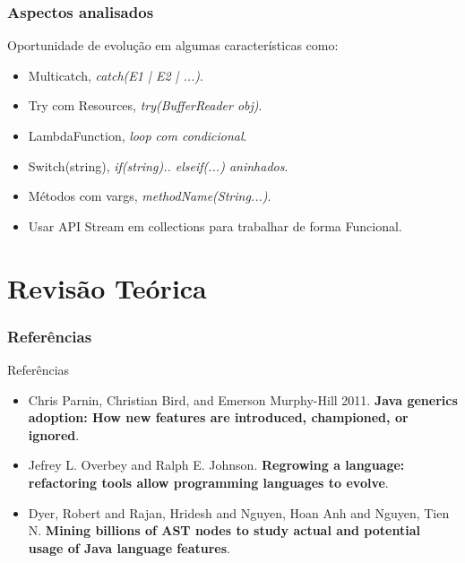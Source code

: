 \documentclass[]{beamer}
\begin{document}
	\begin{frame}[label=ApectosAnalisados]
		\frametitle{Aspectos analisados}
		
			\begin{block}{Oportunidade de evolução em algumas características como:}
				\begin{itemize}
					\item Multicatch, \textit{catch(E1 | E2 | ...)}.
					\item Try com Resources, \textit{try(BufferReader obj)}.
					\item LambdaFunction, \textit{loop com condicional}.
					\item Switch(string), \textit{if(string).. elseif(...) aninhados}.
					\item Métodos com vargs, \textit{methodName(String...)}.
					\item Usar API Stream em collections para trabalhar de forma Funcional.
				\end{itemize}
			\end{block}
	\end{frame}
	

	
%			



	\section{Revisão Teórica}
	\frametitle{Referências}
	\begin{frame}[label=referencias]
		\begin{block}{Referências}
			\begin{itemize}
				\item Chris Parnin, Christian Bird, and Emerson Murphy-Hill 2011. \textbf{Java generics adoption: How new features are introduced, championed, or ignored}.
				
				\item Jefrey L. Overbey and Ralph E. Johnson. \textbf{Regrowing a language: refactoring tools
				allow programming languages to evolve}.
				
				\item Dyer, Robert and Rajan, Hridesh and Nguyen, Hoan Anh and Nguyen, Tien N. \textbf{Mining billions of AST nodes to study actual and potential usage of Java language features}.
			\end{itemize}
			
		\end{block}
	\end{frame}
	
\end{document}
